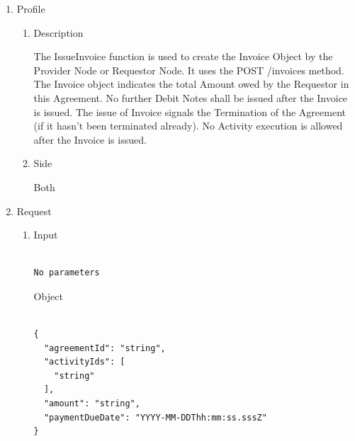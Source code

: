 \newpage


\begin{enumerate}

\item Profile

\begin{enumerate}

\item Description

The IssueInvoice function is used to create the Invoice Object by the Provider Node or Requestor Node. 
It uses the POST /invoices method.
The Invoice object indicates the total Amount owed by the Requestor in this Agreement. 
No further Debit Notes shall be issued after the Invoice is issued. 
The issue of Invoice signals the Termination of the Agreement (if it hasn't been terminated already). 
No Activity execution is allowed after the Invoice is issued.

\item Side

Both

\end{enumerate}

\item Request

\begin{enumerate}

\item Input

\begin{tcolorbox}[boxrule=0pt, frame empty]
\begin{verbatim}

No parameters

\end{verbatim}
\end{tcolorbox}

Object

\begin{tcolorbox}[boxrule=0pt, frame empty]
\begin{verbatim}

{
  "agreementId": "string",
  "activityIds": [
    "string"
  ],
  "amount": "string",
  "paymentDueDate": "YYYY-MM-DDThh:mm:ss.sssZ"
}

\end{verbatim}
\end{tcolorbox}

\begin{table}[H]
\footnotesize


\end{table}
\end{enumerate}
\end{enumerate}
